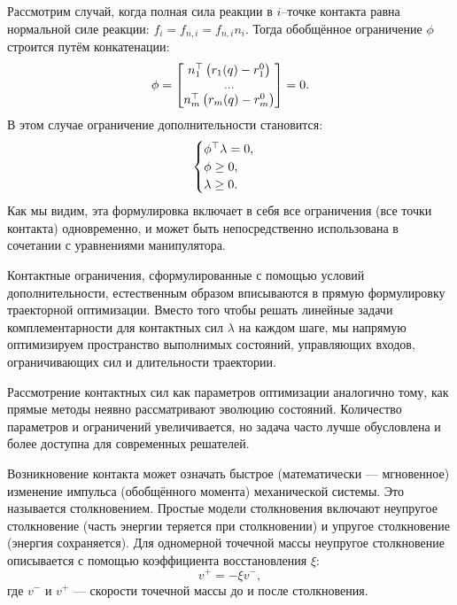 Рассмотрим случай, когда полная сила реакции в $i$--точке контакта равна нормальной силе реакции: ${f}_i = {f}_{n,i} = f_{n,i} {n}_i$. Тогда обобщённое ограничение $\phi$ строится путём конкатенации:
%
\begin{align}
	\phi = \begin{bmatrix}
		{n}_1^\top \left({r}_1({q}) - {r}_1^0 \right) \\
		... \\
		{n}_m^\top \left({r}_m({q}) - {r}_m^0 \right)
	\end{bmatrix}
	= 0.
\end{align}
%
В этом случае ограничение дополнительности становится:
%
\begin{align}
	\begin{cases}
		\phi^\top \lambda = 0, \\
		\phi \geq 0, \\
		\lambda \geq 0.
	\end{cases}
\end{align}
%
Как мы видим, эта формулировка включает в себя все ограничения (все точки контакта) одновременно, и может быть непосредственно использована в сочетании с уравнениями манипулятора.

Контактные ограничения, сформулированные с помощью условий дополнительности, естественным образом вписываются в прямую формулировку траекторной оптимизации. Вместо того чтобы решать линейные задачи комплементарности для контактных сил $\lambda$ на каждом шаге, мы напрямую оптимизируем пространство выполнимых состояний, управляющих входов, ограничивающих сил и длительности траектории. 

Рассмотрение контактных сил как параметров оптимизации аналогично тому, как прямые методы неявно рассматривают эволюцию состояний. Количество параметров и ограничений увеличивается, но задача часто лучше обусловлена и более доступна для современных решателей.

Возникновение контакта может означать быстрое (математически --- мгновенное) изменение импульса (обобщённого момента) механической системы. Это называется столкновением.
%
Простые модели столкновения включают неупругое столкновение (часть энергии теряется при столкновении) и упругое столкновение (энергия сохраняется).
%
Для одномерной точечной массы неупругое столкновение описывается с помощью коэффициента восстановления $\xi$:
%
\begin{equation}
	v^+ = -\xi v^-,
\end{equation}
%
где $v^-$ и $v^+$ --- скорости точечной массы до и после столкновения.

